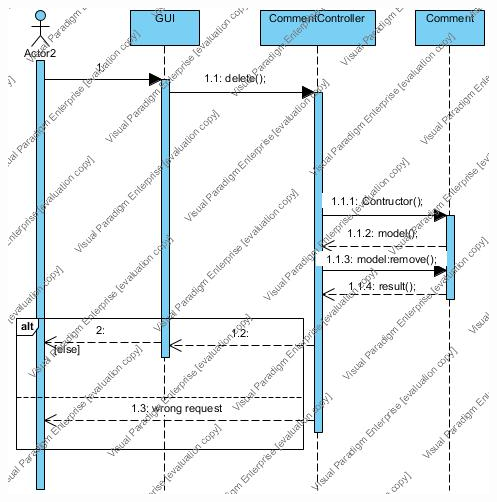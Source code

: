 \documentclass[12pt]{article}
\begin{document}
\includegraphics[scale=0.5]{Sequence04} 
\end{document}
